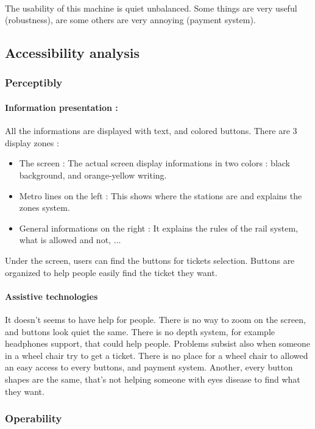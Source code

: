 \documentclass[a4paper,12pt]{article} %
\begin{document}
\paragraph{} The usability of this machine is quiet unbalanced. Some things are very useful (robustness), are some others are very annoying (payment system).
\subsection{Accessibility analysis}
\subsubsection{Perceptibly}
\paragraph{Information presentation : }All the informations are displayed with text, and colored buttons. There are 3 display zones : 
\begin{itemize}
\item The screen  : The actual screen display informations in two colors : black background, and orange-yellow writing.
\item Metro lines on the left : This shows where the stations are and explains the zones system.
\item General informations on the right : It explains the rules of the rail system, what is allowed and not, ...
\end{itemize}
Under the screen, users can find the buttons for tickets selection.  Buttons are organized to help people easily find the ticket they want.
\paragraph{Assistive technologies} It doesn't seems to have help for people. There is no way to zoom on the screen, and buttons look quiet the same. There is no depth system, for example headphones support, that could help people. Problems subsist also when someone in a wheel chair try to get a ticket. There is no place for a wheel chair to allowed an easy access to every buttons, and payment system. Another, every button shapes are the same, that's not helping someone with eyes disease to find what they want.
\subsubsection{Operability}
\end{document}
